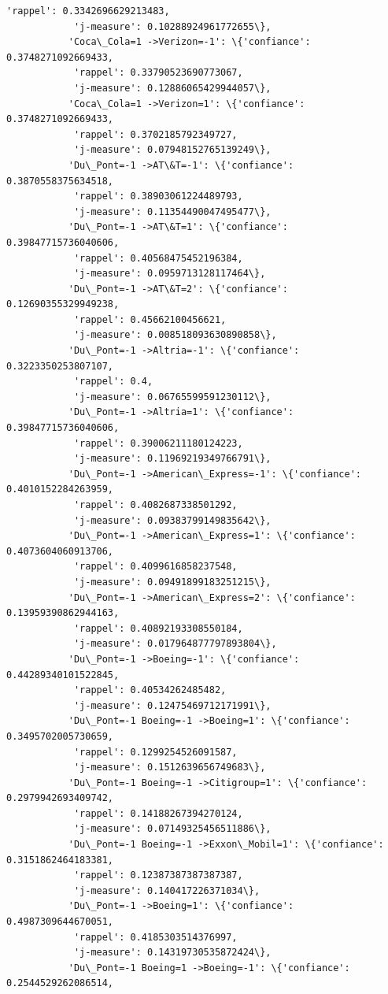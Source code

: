 \documentclass[11pt]{article}
\begin{document}
\begin{Verbatim}[commandchars=\\\{\}]
            'rappel': 0.3342696629213483,
            'j-measure': 0.10288924961772655\},
           'Coca\_Cola=1 ->Verizon=-1': \{'confiance': 0.3748271092669433,
            'rappel': 0.33790523690773067,
            'j-measure': 0.12886065429944057\},
           'Coca\_Cola=1 ->Verizon=1': \{'confiance': 0.3748271092669433,
            'rappel': 0.3702185792349727,
            'j-measure': 0.07948152765139249\},
           'Du\_Pont=-1 ->AT\&T=-1': \{'confiance': 0.3870558375634518,
            'rappel': 0.38903061224489793,
            'j-measure': 0.11354490047495477\},
           'Du\_Pont=-1 ->AT\&T=1': \{'confiance': 0.39847715736040606,
            'rappel': 0.40568475452196384,
            'j-measure': 0.0959713128117464\},
           'Du\_Pont=-1 ->AT\&T=2': \{'confiance': 0.12690355329949238,
            'rappel': 0.45662100456621,
            'j-measure': 0.008518093630890858\},
           'Du\_Pont=-1 ->Altria=-1': \{'confiance': 0.3223350253807107,
            'rappel': 0.4,
            'j-measure': 0.06765599591230112\},
           'Du\_Pont=-1 ->Altria=1': \{'confiance': 0.39847715736040606,
            'rappel': 0.39006211180124223,
            'j-measure': 0.11969219349766791\},
           'Du\_Pont=-1 ->American\_Express=-1': \{'confiance': 0.4010152284263959,
            'rappel': 0.4082687338501292,
            'j-measure': 0.09383799149835642\},
           'Du\_Pont=-1 ->American\_Express=1': \{'confiance': 0.4073604060913706,
            'rappel': 0.4099616858237548,
            'j-measure': 0.09491899183251215\},
           'Du\_Pont=-1 ->American\_Express=2': \{'confiance': 0.13959390862944163,
            'rappel': 0.40892193308550184,
            'j-measure': 0.017964877797893804\},
           'Du\_Pont=-1 ->Boeing=-1': \{'confiance': 0.44289340101522845,
            'rappel': 0.40534262485482,
            'j-measure': 0.12475469712171991\},
           'Du\_Pont=-1 Boeing=-1 ->Boeing=1': \{'confiance': 0.3495702005730659,
            'rappel': 0.1299254526091587,
            'j-measure': 0.1512639656749683\},
           'Du\_Pont=-1 Boeing=-1 ->Citigroup=1': \{'confiance': 0.2979942693409742,
            'rappel': 0.14188267394270124,
            'j-measure': 0.07149325456511886\},
           'Du\_Pont=-1 Boeing=-1 ->Exxon\_Mobil=1': \{'confiance': 0.3151862464183381,
            'rappel': 0.12387387387387387,
            'j-measure': 0.140417226371034\},
           'Du\_Pont=-1 ->Boeing=1': \{'confiance': 0.4987309644670051,
            'rappel': 0.4185303514376997,
            'j-measure': 0.14319730535872424\},
           'Du\_Pont=-1 Boeing=1 ->Boeing=-1': \{'confiance': 0.2544529262086514,

\end{Verbatim}
\end{document}
